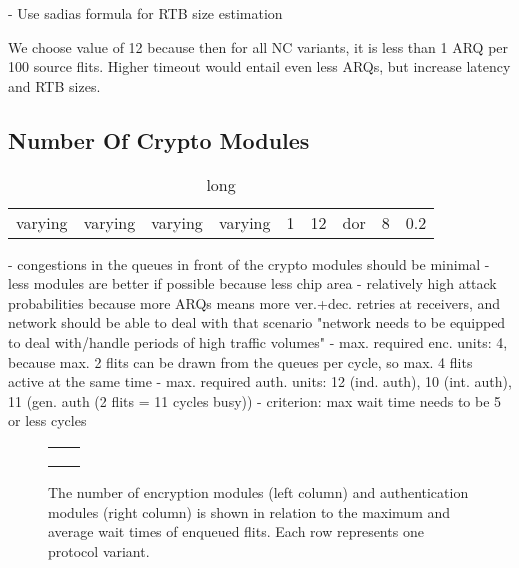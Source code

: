 - Use sadias formula for RTB size estimation

We choose value of 12 because then for all NC variants, it is less than 1 ARQ per 100 source flits. Higher timeout would entail even less ARQs, but
increase latency and RTB sizes.

\subsection{Number Of Crypto Modules}
\begin{table}
    \centering
    \begin{tabulary}{\textwidth}{C|C|C|C|C|C|C|C|C}
        \pProtVar{} & \pNCMode{} & \pEncMods{} & \pAuthMods{} & \pARQLimit{} & \pARQTimeout{} & \pRStrat{} & \pNumAttackers{} & \pAttackProb{} \\\hline
        varying & varying & varying & varying & 1 & 12 & \gls{dor} & 8 & 0.2 \\
    \end{tabulary}
    \caption[Input parameters for number of crypto modules experiment]{long}
    \label{tab:setupnumcrypto}
\end{table}
- congestions in the queues in front of the crypto modules should be minimal
- less modules are better if possible because less chip area
- relatively high attack probabilities because more ARQs means more ver.+dec. retries at receivers, and network should be able to deal with that scenario
  "network needs to be equipped to deal with/handle periods of high traffic volumes"
- max. required enc. units: 4, because max. 2 flits can be drawn from the queues per cycle, so max. 4 flits active at the same time
- max. required auth. units: 12 (ind. auth), 10 (int. auth), 11 (gen. auth (2 flits = 11 cycles busy))
- criterion: max wait time needs to be 5 or less cycles

\begin{figure}
    \centering
    \begin{tabular}{ll}
         &  \\
         &  \\
         & 
    \end{tabular}
    \caption[Results for number of crypto modules experiment]{The number of encryption modules (left column) and authentication modules (right column)
    is shown in relation to the maximum and average wait times of enqueued flits. Each row represents one protocol variant.}
    \label{fig:resultscryptomodules}
\end{figure}

